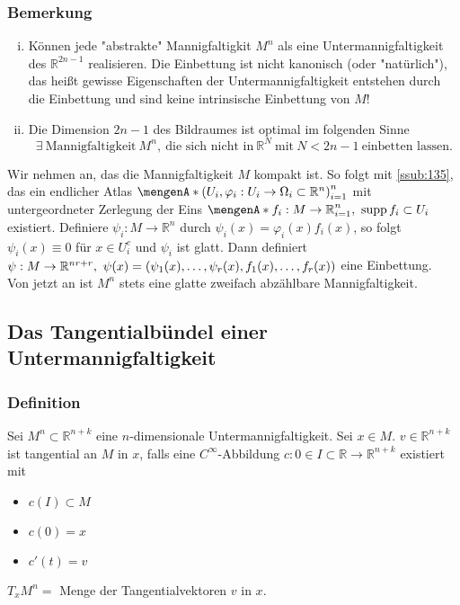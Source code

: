 \subsubsection{Bemerkung}
\label{ssub:124}
\begin{enumerate}[(i)]
\item Können jede "abstrakte" Mannigfaltigkit $M^n$ als eine Untermannigfaltigkeit des $\mathds{R}^{2n-1}$ realisieren.
Die Einbettung ist nicht kanonisch (oder "natürlich"), das heißt gewisse Eigenschaften der Untermannigfaltigkeit entstehen durch die Einbettung und sind keine intrinsische Einbettung von $M$!
\item Die Dimension $2n-1$ des Bildraumes ist optimal im folgenden Sinne
\[
\exists\ \text{Mannigfaltigkeit}\ M^n,\ \text{die sich nicht in}\ \mathds{R}^N\ \text{mit}\ N<2n-1\ \text{einbetten lassen.}
\]
\end{enumerate}
Wir nehmen an, das die Mannigfaltigkeit $M$ kompakt ist. So folgt mit \ref{ssub:135}, das ein endlicher Atlas $\set{\enbrace{U_i,\varphi_i : U_i \to \Omega_i\subset \mathds{R}^n}}_{i=1}^n$ mit untergeordneter Zerlegung der Eins $\set{f_i:M\to \mathds{R}}_{i=1}^n,\ \supp f_i \subset U_i$ existiert. Definiere $\psi_i:M\to \mathds{R}^n$ durch $\psi_i(x) = \varphi_i(x)f_i(x)$, so folgt $\psi_i(x) \equiv 0$ für $x\in U_i^c$ und $\psi_i$ ist glatt. Dann definiert $\psi: M\to \mathds{R}^{nr+r},\ \psi(x)=\enbrace{\psi_1(x),\ldots,\psi_r(x),f_1(x),\ldots,f_r(x)}$ eine Einbettung.\\
Von jetzt an ist $M^n$ stets eine glatte zweifach abzählbare Mannigfaltigkeit.


\subsection{Das Tangentialbündel einer Untermannigfaltigkeit}
\label{sub:14}

\subsubsection{Definition}
\label{ssub:125}
Sei $M^n\subset \mathds{R}^{n+k}$ eine $n$-dimensionale Untermannigfaltigkeit. Sei $x\in M$. $v\in \mathds{R}^{n+k}$ ist tangential an $M$ in $x$, falls eine $C^{\infty}$-Abbildung $c: 0\in I\subset \mathds{R} \to \mathds{R}^{n+k}$ existiert mit
\begin{itemize}
\item $c(I)\subset M$
\item $c(0) = x$
\item $c'(t) = v$
\end{itemize}
$T_x M^n = $ Menge der Tangentialvektoren $v$ in $x$.

